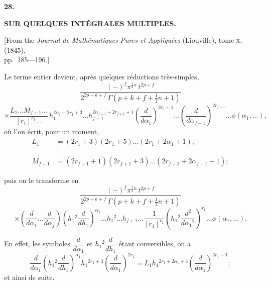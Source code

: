 \documentclass[11pt,a4paper]{article}
\begin{document}

\newpage
{}
\setcounter{page}{197}

\begin{center}
{\large\bfseries 28.}
\end{center}
\vspace{0.5em}
\begin{center}
{\large\bfseries SUR QUELQUES INT\'{E}GRALES MULTIPLES.}
\end{center}
\vspace{0.5em}
\begin{center}
{[From the \textit{Journal de Math\'{e}matiques Pures et Appliqu\'{e}es} (Liouville), tome \textsc{x}. (1845),\\
pp.~185---196.]}
\end{center}
\vspace{1em}

Le terme entier devient, apr\`{e}s quelques r\'{e}ductions tr\`{e}s-simples,
\[
\frac{(-)^f \pi^{\frac{1}{2}n} \, t^{2p+f}}{2^{2p+k+f} \, \Gamma\left(p + k + f + \tfrac{1}{2}n + 1\right)}
\]
\[
\times \frac{L_1 \ldots M_{f+1} \ldots}{[r_1]^{r_1} \ldots} \, h_1^{2\alpha_1 + 2r_1 + 3} \ldots h_{f+1}^{2\alpha_{f+1} + 2r_{f+1} + 1} \left(\frac{d}{d\alpha_1}\right)^{2r_1+1} \ldots \left(\frac{d}{d\alpha_{f+1}}\right)^{2r_{f+1}} \ldots \phi(\alpha_1, \ldots),
\]
o\`{u} l'on \'{e}crit, pour un moment,
\begin{align*}
L_1 &= (2r_1 + 3)(2r_1 + 5) \ldots (2r_1 + 2\alpha_1 + 1),\\
&\ \vdots\\
M_{f+1} &= (2r_{f+1} + 1)(2r_{f+1} + 3) \ldots (2r_{f+1} + 2\alpha_{f+1} - 1);
\end{align*}

\newpage
\setcounter{page}{198}

puis on le transforme en
\[
\frac{(-)^f \pi^{\frac{1}{2}n} \, t^{2p+f}}{2^{2p+k+f} \, \Gamma\left(p + k + f + \tfrac{1}{2}n + 1\right)}
\]
\[
\times \left(\frac{d}{d\alpha_1} \ldots \frac{d}{d\alpha_f}\right) \left(h_1{}^{2} \frac{d}{dh_1}\right)^{\alpha_1} \ldots h_1{}^{2} \ldots h_{f+1} \ldots \frac{1}{[r_1]^{r_1}} \left(h_1{}^{2} \frac{d^{2}}{d\alpha_1{}^{2}}\right)^{r_1} \ldots \phi(\alpha_1, \ldots).
\]

En effet, les symboles $\dfrac{d}{d\alpha_1}$ et $h_1{}^{2}\dfrac{d}{dh_1}$ \'{e}tant conversibles, on a
\[
\frac{d}{d\alpha_1} \left(h_1{}^{2} \frac{d}{dh_1}\right)^{\alpha_1} h_1{}^{2r_1+3} \left(\frac{d}{d\alpha_1}\right)^{2r_1} = L_1 h_1{}^{2r_1+2\alpha_1+3} \left(\frac{d}{d\alpha_1}\right)^{2r_1+1};
\]
et ainsi de suite.
\end{document}
